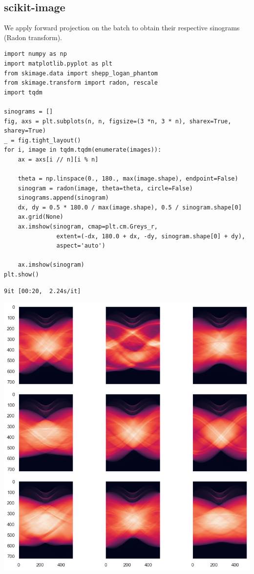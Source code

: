 \documentclass[a4paper, 11pt]{article}
\begin{document}
\subsection{scikit-image}
\label{sec:org6a365cf}
We apply forward projection on the batch to obtain their respective sinograms (Radon transform).
\begin{verbatim}
import numpy as np
import matplotlib.pyplot as plt
from skimage.data import shepp_logan_phantom
from skimage.transform import radon, rescale
import tqdm

sinograms = []
fig, axs = plt.subplots(n, n, figsize=(3 *n, 3 * n), sharex=True, sharey=True)
_ = fig.tight_layout()
for i, image in tqdm.tqdm(enumerate(images)):
    ax = axs[i // n][i % n]

    theta = np.linspace(0., 180., max(image.shape), endpoint=False)
    sinogram = radon(image, theta=theta, circle=False)
    sinograms.append(sinogram)
    dx, dy = 0.5 * 180.0 / max(image.shape), 0.5 / sinogram.shape[0]
    ax.grid(None)
    ax.imshow(sinogram, cmap=plt.cm.Greys_r,
               extent=(-dx, 180.0 + dx, -dy, sinogram.shape[0] + dy),
               aspect='auto')

    ax.imshow(sinogram)
plt.show()
\end{verbatim}

\begin{verbatim}
9it [00:20,  2.24s/it]

\end{verbatim}

\begin{center}
\includegraphics[width=.9\linewidth]{./.ob-jupyter/dc176021f0a9c60e509498d6f9d407a2ec448a35.png}
\end{center}
\end{document}

